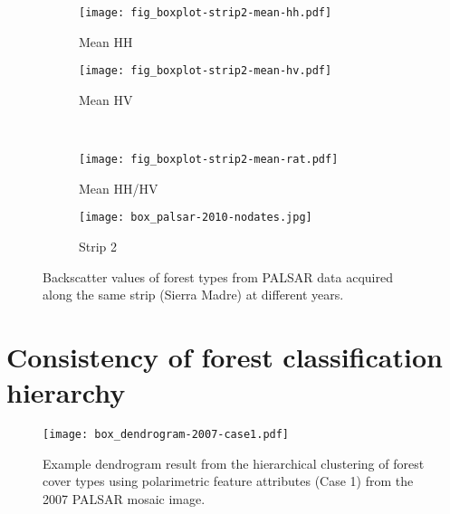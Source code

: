 \begin{figure}[!ht] \centering
	\captionsetup[subfigure]{width=2.0in} %
	\begin{subfigure}[t]{0.49\textwidth}
		\texttt{[image: fig\_boxplot-strip2-mean-hh.pdf]}
		\caption[Same strip backscatter boxplots.]{Mean HH}
		\label{fig: result-fig4.6a}
	\end{subfigure}
	\begin{subfigure}[t]{0.49\textwidth}
		\texttt{[image: fig\_boxplot-strip2-mean-hv.pdf]}
		\caption[Same strip backscatter boxplots.]{Mean HV}
		\label{fig: result-fig4.6b}
	\end{subfigure}\\
	\vspace{10pt}
	\begin{subfigure}[t]{0.49\textwidth}
		\texttt{[image: fig\_boxplot-strip2-mean-rat.pdf]}
		\caption[Same strip backscatter boxplots.]{Mean HH/HV}
		\label{fig: result-fig4.6c}
	\end{subfigure}
	\begin{subfigure}[t]{0.49\textwidth}
		\texttt{[image: box\_palsar-2010-nodates.jpg]}
		\caption[Same strip backscatter boxplots.]{Strip 2}
		\label{fig: result-fig4.6d}
	\end{subfigure}
	\caption[Backscatter values of forest types from PALSAR data acquired along the same strip (Sierra Madre) at different years.]{Backscatter values of forest types from PALSAR data acquired along the same strip (Sierra Madre) at different years.}
	\label{fig: result-fig4.6}
\end{figure}

\section{Consistency of forest classification hierarchy}
\label{sec: result-hierarchy-consistency}

\begin{figure}
	\centering
	\texttt{[image: box\_dendrogram-2007-case1.pdf]}
	\caption[Box 3. Example dendrogram result from the hierarchical clustering of forest cover types using polarimetric feature attributes (Case 1) from the 2007 PALSAR mosaic image.]{Example dendrogram result from the hierarchical clustering of forest cover types using polarimetric feature attributes (Case 1) from the 2007 PALSAR mosaic image.}
	\label{fig: result-fig4.7}
\end{figure}

